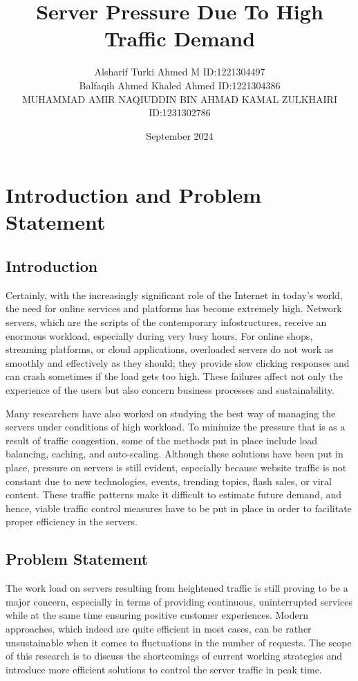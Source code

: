 \documentclass{article}
\title{Server Pressure Due To High Traffic Demand}
\author{Alsharif Turki Ahmed M ID:1221304497 \\ Balfaqih Ahmed Khaled Ahmed ID:1221304386 \\ MUHAMMAD AMIR NAQIUDDIN BIN AHMAD KAMAL ZULKHAIRI ID:1231302786 }
\date{September 2024}
\begin{document}
\maketitle

\section{Introduction and Problem Statement }
\subsection{Introduction}
Certainly, with the increasingly significant role of the Internet in today’s world, the need for online services and platforms has become extremely high. Network servers, which are the scripts of the contemporary infostructures, receive an enormous workload, especially during very busy hours. For online shops, streaming platforms, or cloud applications, overloaded servers do not work as smoothly and effectively as they should; they provide slow clicking responses and can crash sometimes if the load gets too high. These failures affect not only the experience of the users but also concern business processes and sustainability.

Many researchers have also worked on studying the best way of managing the servers under conditions of high workload. To minimize the pressure that is as a result of traffic congestion, some of the methods put in place include load balancing, caching, and auto-scaling. Although these solutions have been put in place, pressure on servers is still evident, especially because website traffic is not constant due to new technologies, events, trending topics, flash sales, or viral content. These traffic patterns make it difficult to estimate future demand, and hence, viable traffic control measures have to be put in place in order to facilitate proper efficiency in the servers.

\subsection{Problem Statement}
The work load on servers resulting from heightened traffic is still proving to be a major concern, especially in terms of providing continuous, uninterrupted services while at the same time ensuring positive customer experiences. Modern approaches, which indeed are quite efficient in most cases, can be rather unsustainable when it comes to fluctuations in the number of requests. The scope of this research is to discuss the shortcomings of current working strategies and introduce more efficient solutions to control the server traffic in peak time.
\end{document}
